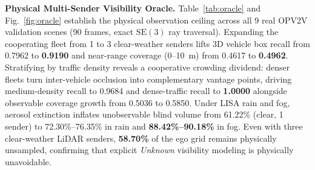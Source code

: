 \documentclass[journal]{IEEEtran}
\begin{document}
\textbf{Physical Multi-Sender Visibility Oracle.} Table~\ref{tab:oracle} and Fig.~\ref{fig:oracle} establish the physical observation ceiling across all 9 real OPV2V validation scenes (90 frames, exact $\mathrm{SE}(3)$ ray traversal). Expanding the cooperating fleet from 1 to 3 clear-weather senders lifts 3D vehicle box recall from 0.7962 to \textbf{0.9190} and near-range coverage (0--10~m) from 0.4617 to \textbf{0.4962}. Stratifying by traffic density reveals a cooperative crowding dividend: denser fleets turn inter-vehicle occlusion into complementary vantage points, driving medium-density recall to 0.9684 and dense-traffic recall to \textbf{1.0000} alongside observable coverage growth from 0.5036 to 0.5850. Under LISA rain and fog, aerosol extinction inflates unobservable blind volume from 61.22\% (clear, 1 sender) to 72.30\%--76.35\% in rain and \textbf{88.42\%--90.18\%} in fog. Even with three clear-weather LiDAR senders, \textbf{58.70\%} of the ego grid remains physically unsampled, confirming that explicit \textit{Unknown} visibility modeling is physically unavoidable.
\end{document}
